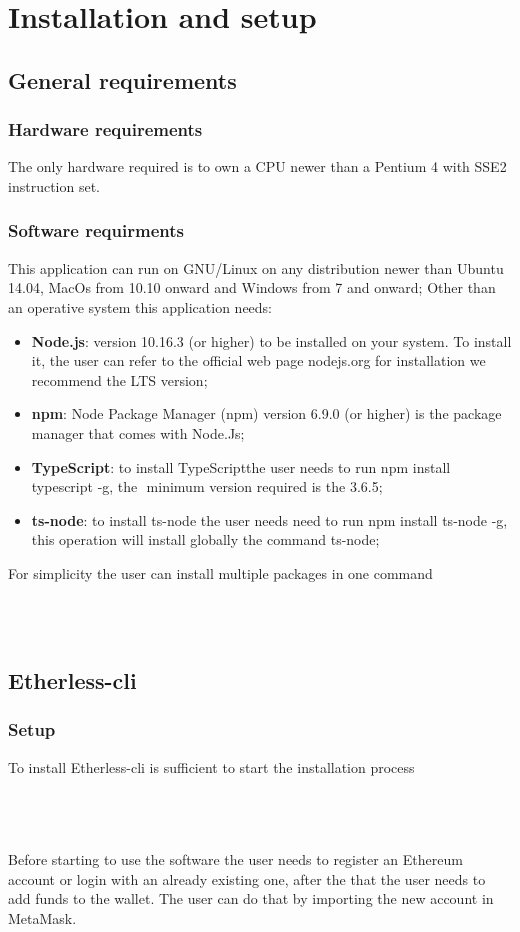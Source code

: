 \section{Installation and setup}
\subsection{General requirements}
\subsubsection{Hardware requirements}
The only hardware required is to own a CPU newer than a Pentium 4 with SSE2 instruction set. 
\subsubsection{Software requirments }
This application can run on GNU/Linux on any distribution newer than Ubuntu 14.04, MacOs from 10.10 onward and Windows from 7 and onward; Other than an operative system this application needs: 
\begin{itemize}
	\item \textbf{Node.js}: version 10.16.3 (or higher) to be installed on your system. To install it, the user can refer to the official web page nodejs.org for installation we recommend the LTS version;
	\item \textbf{npm}: Node Package Manager (npm) version 6.9.0 (or higher) is the package manager that comes with Node.Js; 
	\item \textbf{TypeScript}: to install TypeScript\glo the user needs to run npm install typescript -g, the  minimum version required is the 3.6.5; 
	\item \textbf{ts-node}: to install ts-node the user needs need to run npm install ts-node -g, this operation will install globally the command ts-node; 
\end{itemize}
For simplicity the user can install multiple packages in one command\\\\
\centerline{}\\
\subsection{Etherless-cli}
\subsubsection{Setup}
To install Etherless-cli is sufficient to start the installation process\\\\
\centerline{}\\\\
Before starting to use the software the user needs to register an Ethereum account or login with an already existing one, after the that the user needs to add funds to the wallet. The user can do that by importing the new account in MetaMask\glo.
